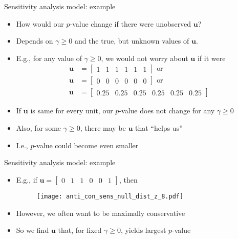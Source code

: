 \documentclass[table, xcolor={dvipsnames}, 9pt]{beamer}
\theoremstyle{newstyle}
\begin{document}
\begin{frame}{Sensitivity analysis model: example}
\vfill
\begin{itemize}
\item How would our $p$-value change if there were unobserved $\bm{u}$? \vfill 
\item Depends on $\gamma \geq 0$ and the true, but unknown values of $\bm{u}$. \vfill
\item E.g., for any value of $\gamma \geq 0$, we would not worry about $\bm{u}$ if it were \vfill
\begin{align*}
\bm{u} & = \begin{bmatrix} 1 & 1 & 1 & 1 & 1 & 1 \end{bmatrix} \text{ or } \\
\bm{u} & = \begin{bmatrix} 0 & 0 & 0 & 0 & 0 & 0 \end{bmatrix} \text{ or } \\
\bm{u} & = \begin{bmatrix} 0.25 & 0.25 & 0.25 & 0.25 & 0.25 & 0.25 \end{bmatrix}
\end{align*} \vfill
\item If $\bm{u}$ is same for every unit, our $p$-value does not change for any $\gamma \geq 0$ \vfill
\item Also, for some $\gamma \geq 0$, there may be $\bm{u}$ that ``helps us'' \vfill
\item[] I.e., $p$-value could become even smaller \vfill
\end{itemize} \vfill
\end{frame}
\begin{frame}{Sensitivity analysis model: example}
\vfill
\begin{itemize} \vfill
\item E.g., if $\bm{u} = \begin{bmatrix} 0 & 1 & 1 & 0 & 0 & 1 \end{bmatrix}$, then \vfill
\begin{figure}
\texttt{[image: anti\_con\_sens\_null\_dist\_z\_8.pdf]}
\end{figure} \vfill
\item However, we often want to be maximally conservative \vfill
\item So we find $\bm{u}$ that, for fixed $\gamma \geq 0$, yields largest $p$-value \vfill
\end{itemize} \vfill
\end{frame}
\end{document}
